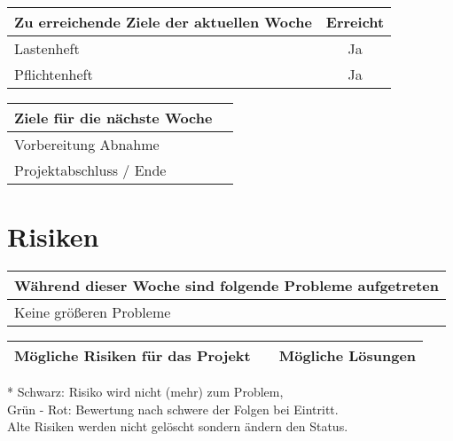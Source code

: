 \begin{tabularx}{\textwidth}{Xc}
    \arrayrulecolor{OliveGreen}
    \toprule
    {\bfseries Zu erreichende Ziele der aktuellen Woche} & {\bfseries Erreicht} \\
    \midrule[2pt]
    Lastenheft                                           &Ja                    \\
    \rowcolor{OliveGreen!15}
    Pflichtenheft                                        &Ja                    \\
    \bottomrule[2pt]
\end{tabularx}
%
\vspace{1cm}
%
\begin{tabularx}{\textwidth}{Xc}
    \arrayrulecolor{OliveGreen}
    \toprule
    {\bfseries Ziele für die nächste Woche}              &                      \\
    \midrule[2pt]
    Vorbereitung Abnahme                                 &                      \\
    \rowcolor{OliveGreen!15}
    Projektabschluss / Ende                              &                      \\
\end{tabularx}

\section*{Risiken}

\begin{tabularx}{\textwidth}{X}
    \arrayrulecolor{OliveGreen}
    \toprule
    {\bfseries Während dieser Woche sind folgende Probleme aufgetreten}         \\
    \midrule[2pt]
    Keine größeren Probleme                                                     \\
    \bottomrule[2pt]
\end{tabularx}

\vspace{1cm}

\begin{threeparttable}
    \begin{tabularx}{\textwidth}{XcX}
        \arrayrulecolor{OliveGreen}
        \toprule
        {\bfseries Mögliche Risiken für das Projekt} & {\bfseries *}  & {\bfseries Mögliche Lösungen}  \\ \midrule[2pt]
        \bottomrule[2pt]
    \end{tabularx}

    \begin{tablenotes}\footnotesize
        \item[*] Schwarz: Risiko wird nicht (mehr) zum Problem, \\
                 Grün - Rot: Bewertung nach schwere der Folgen bei Eintritt.\\
                 Alte Risiken werden nicht gelöscht sondern ändern den Status.
    \end{tablenotes}
\end{threeparttable}

